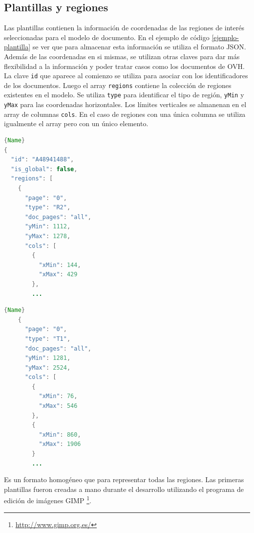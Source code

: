 \subsection{Plantillas y regiones}


Las plantillas contienen la información de coordenadas de las regiones de interés seleccionadas para el modelo de documento. En el ejemplo de código \ref{ejemplo-plantilla} se ver que para almacenar esta información se utiliza el formato JSON. Además de las coordenadas en si mismas, se utilizan otras claves para dar más flexibilidad a la información y poder tratar casos como los documentos de OVH. La clave \verb|id| que aparece al comienzo se utiliza para asociar con los identificadores de los documentos. Luego el array \verb|regions| contiene la colección de regiones existentes en el modelo. Se utiliza \verb|type| para identificar el tipo de región, \verb|yMin| y \verb|yMax| para las coordenadas horizontales. Los límites verticales se almanenan en el array de columnas \verb|cols|. En el caso de regiones con una única columna se utiliza igualmente el array pero con un único elemento.

\noindent\begin{minipage}{.45\textwidth}
    \begin{lstlisting}[language=Java,caption=Comienzo de la plantilla,frame=tlrb]{Name}
{
  "id": "A48941488",
  "is_global": false,
  "regions": [
    {
      "page": "0",
      "type": "R2",
      "doc_pages": "all",
      "yMin": 1112,
      "yMax": 1278,
      "cols": [
        {
          "xMin": 144,
          "xMax": 429
        },
        ...
    \end{lstlisting}
\end{minipage}\hfill
\begin{minipage}{.45\textwidth}
    \begin{lstlisting}[language=Java,caption=Región T1,frame=tlrb]{Name}
    {
      "page": "0",
      "type": "T1",
      "doc_pages": "all",
      "yMin": 1281,
      "yMax": 2524,
      "cols": [
        {
          "xMin": 76,
          "xMax": 546
        },
        {
          "xMin": 860,
          "xMax": 1906
        }
        ...
    \end{lstlisting}
\end{minipage}

Es un formato homogéneo que para representar todas las regiones. Las primeras plantillas fueron creadas a mano durante el desarrollo utilizando el programa de edición de imágenes GIMP \footnote{\url{http://www.gimp.org.es/}}.

